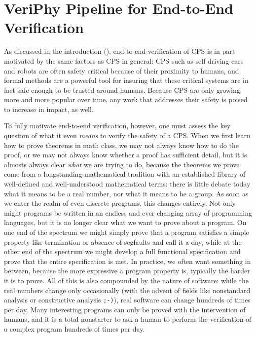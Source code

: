 \documentclass[12pt]{cmuthesis}
\theoremstyle{definition}
\theoremstyle{remark}
\newcommand{\rref}[2][]{\prettyref{#2}}
\newcommand{\VeriPhy}{VeriPhy\xspace}
\begin{document}
\section{\VeriPhy Pipeline for End-to-End Verification}
\label{sec:veriphy}
As discussed in the introduction (\rref{ch:introduction}), end-to-end verification of CPS is in part motivated by the same factors as CPS in general: CPS such as self driving cars and robots are often safety critical because of their proximity to humans, and formal methods are a powerful tool for insuring that these critical systems are in fact safe enough to be trusted around humans. Because CPS are only growing more and more popular over time, any work that addresses their safety is poised to increase in impact, as well.

To fully motivate end-to-end verification, however, one must assess the key question of what it even \emph{means} to verify the safety of a CPS.
When we first learn how to prove theorems in math class, we may not always know how to do the proof, or we may not always know whether a proof has sufficient detail, but it is almosts always clear \emph{what} we are trying to do, because the theorems we prove come from a longstanding mathematical tradition with an established library of well-defined and well-understood mathematical terms: there is little debate today what it means to be a real number, nor what it means to be a group.
As soon as we enter the realm of even discrete programs, this changes entirely. Not only might programs be written in an endless and ever changing array of programming languages, but it is no longer clear what we want to prove about a program. On one end of the spectrum we might simply prove that a program satisfies a simple property like termination or absence of segfaults and call it a day, while at the other end of the spectrum we might develop a full functional specification and prove that the entire specification is met. In practice, we often want something in between, because the more expressive a program property is, typically the harder it is to prove. All of this is also compounded by the nature of software: while the real numbers change only occasionally (with the advent of fields like nonstandard analysis or constructive analysis \texttt{;-)}), real software can change hundreds of times per day. Many interesting programs can only be proved with the intervention of humans, and it is a total nonstarter to ask a human to perform the verification of a complex program hundreds of times per day.
\end{document}
